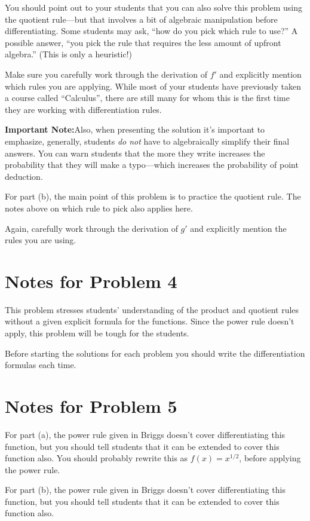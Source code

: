 \documentclass[handout,nooutcomes]{ximera}
\begin{document}
You should point out to your students that you can also solve this problem using the quotient rule---but that involves a bit of algebraic manipulation before differentiating.
Some students may ask, ``how do you pick which rule to use?''
A possible answer, ``you pick the rule that requires the less amount of upfront algebra.''
(This is only a heuristic!)
               
Make sure you carefully work through the derivation of $f'$ and explicitly mention which rules you are applying.
While most of your students have previously taken a course called ``Calculus'', there are still many for whom this is the first time they are working with differentiation rules.

\textbf{Important Note:}Also, when presenting the solution it's important to emphasize, generally, students \emph{do not} have to algebraically simplify their final answers.
You can warn students that the more they write increases the probability that they will make a typo---which increases the probability of point deduction.

For part (b), the main point of this problem is to practice the quotient rule.
The notes above on which rule to pick also applies here.

Again, carefully work through the derivation of $g'$ and explicitly mention the rules you are using.


\section{Notes for Problem 4}
    This problem stresses students' understanding of the product and quotient rules without a given explicit formula for the functions.
    Since the power rule doesn't apply, this problem will be tough for the students.

    Before starting the solutions for each problem you should write the differentiation formulas each time.

\section{Notes for Problem 5}

For part (a), the power rule given in Briggs doesn't cover differentiating this function, but you should tell students that it can be extended to cover this function also.
You should probably rewrite this as $f(x) = x^{1/2}$, before applying the power rule.

For part (b), the power rule given in Briggs doesn’t cover differentiating this function, but you should tell students that it can be extended to cover this function also.
\end{document}
